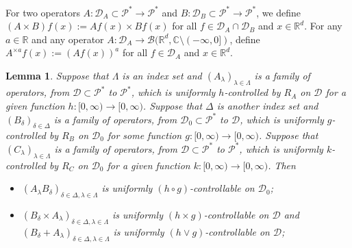 \documentclass[12pt,a4paper]{amsart}
\theoremstyle{plain}
\newtheorem{lem}[thm]{Lemma}
\theoremstyle{definition}
\numberwithin{equation}{section}
\begin{document}
For two operators $A: \mathcal D_A \subset \mathcal P^*\to \mathcal P^*$ and $B: \mathcal D_B \subset \mathcal P^*\to \mathcal P^*$, we define $(A \times B)f (x):= Af(x) \times Bf(x)$ for all $f\in \mathcal D_A \cap \mathcal D_B$ and $x\in \mathbb{R}^d$.
For any $a \in \mathbb R$ and any operator $A :\mathcal D_A \to \mathcal B(\mathbb R^d, \mathbb C\setminus (-\infty, 0])$, define $A^{\times a}f(x):= (Af(x))^a$ for all $f\in \mathcal D_A$ and $x\in \mathbb R^d$.
\begin{lem}
  \label{lem: property of controllable operators}
  Suppose that $\Lambda$ is an index set and $(A_\lambda)_{\lambda\in \Lambda}$ is a
  family of operators, from $\mathcal D\subset \mathcal P^*$ to $ \mathcal P^*$,
  which is uniformly 
  $h$-controlled by $R_A$ on $\mathcal D$ for a given function $h:[0,\infty) \to [0, \infty)$.
  Suppose that $\Delta$ is another index set and $(B_\delta)_{\delta\in \Delta}$ is a family of operators, from $\mathcal D_0\subset \mathcal P^*$ to $ \mathcal D$,
  which is uniformly $g$-controlled by $R_B$ on $\mathcal D_0$ 
  for some function $g: [0,\infty) \to [0,\infty)$. 
  Suppose that $(C_\lambda)_{\lambda\in \Lambda} $ is a family of operators, from $\mathcal D\subset \mathcal P^*$ to $ \mathcal P^*$,
  which is uniformly $k$-controlled by $R_C$ on $\mathcal D_0$ for a given function $k:[0,\infty) \to [0, \infty)$.
  Then 
  \begin{itemize}
  \item[(1)]
    $(A_\lambda B_\delta)_{\delta\in \Delta, \lambda \in \Lambda}$ is uniformly $(h \circ g)$-controllable on $\mathcal D_0$;
  \item[(2)]
    $(B_\delta\times A_\lambda)_{\delta \in \Delta, \lambda \in \Lambda}$ is uniformly $(h\times g)$-controllable on $\mathcal D$ and $(B_\delta + A_\lambda)_{\delta \in \Delta, \lambda \in \Lambda}$ is uniformly $(h\vee g)$-controllable on $\mathcal D$;

\end{itemize}
\end{lem}
\end{document}
